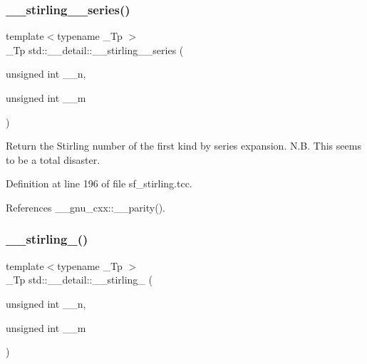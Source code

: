 \mbox{\label{namespacestd_1_1____detail_adb65db9b399228c604c5f72156695965}} 
\subsubsection{\texorpdfstring{\+\_\+\+\_\+stirling\+\_\+\_\+series()}{\_\_stirling\_1\_series()}}
{\footnotesize\ttfamily template$<$typename \+\_\+\+Tp $>$ \\
\+\_\+\+Tp std\+::\+\_\+\+\_\+detail\+::\+\_\+\+\_\+stirling\+\_\+\_\+series (\begin{DoxyParamCaption}\item[{unsigned int}]{\+\_\+\+\_\+n,  }\item[{unsigned int}]{\+\_\+\+\_\+m }\end{DoxyParamCaption})}

Return the Stirling number of the first kind by series expansion. N.\+B. This seems to be a total disaster. 

Definition at line 196 of file sf\+\_\+stirling.\+tcc.



References \+\_\+\+\_\+gnu\+\_\+cxx\+::\+\_\+\+\_\+parity().

\mbox{\label{namespacestd_1_1____detail_a4589d459a7a9d1d9e19b33601238a4af}} 
\subsubsection{\texorpdfstring{\+\_\+\+\_\+stirling\+\_()}{\_\_stirling\_2()}}
{\footnotesize\ttfamily template$<$typename \+\_\+\+Tp $>$ \\
\+\_\+\+Tp std\+::\+\_\+\+\_\+detail\+::\+\_\+\+\_\+stirling\+\_ (\begin{DoxyParamCaption}\item[{unsigned int}]{\+\_\+\+\_\+n,  }\item[{unsigned int}]{\+\_\+\+\_\+m }\end{DoxyParamCaption})}

